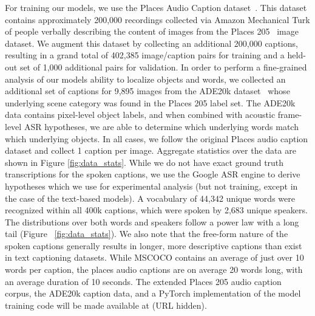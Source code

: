 For training our models, we use the Places Audio Caption dataset~\cite{harwath_nips,harwath_acl_2017}. This dataset contains approximately 200,000 recordings collected via Amazon Mechanical Turk of people verbally describing the content of images from the Places 205~\cite{places} image dataset. We augment this dataset by collecting an additional 200,000 captions, resulting in a grand total of 402,385 image/caption pairs for training and a held-out set of 1,000 additional pairs for validation. In order to perform a fine-grained analysis of our models ability to localize objects and words, we collected an additional set of captions for 9,895 images from the ADE20k dataset~\cite{ade20k} whose underlying scene category was found in the Places 205 label set. The ADE20k data contains pixel-level object labels, and when combined with acoustic frame-level ASR hypotheses, we are able to determine which underlying words match which underlying objects. In all cases, we follow the original Places audio caption dataset and collect 1 caption per image. Aggregate statistics over the data are shown in Figure \ref{fig:data_stats}. While we do not have exact ground truth transcriptions for the spoken captions, we use the Google ASR engine to derive hypotheses which we use for experimental analysis (but not training, except in the case of the text-based models). A vocabulary of 44,342 unique words were recognized within all 400k captions, which were spoken by 2,683 unique speakers. The distributions over both words and speakers follow a power law with a long tail (Figure ~\ref{fig:data_stats}). We also note that the free-form nature of the spoken captions generally results in longer, more descriptive captions than exist in text captioning datasets. While MSCOCO \cite{mscoco} contains an average of just over 10 words per caption, the places audio captions are on average 20 words long, with an average duration of 10 seconds. The extended Places 205 audio caption corpus, the ADE20k caption data, and a PyTorch implementation of the model training code will be made available at (URL hidden).

